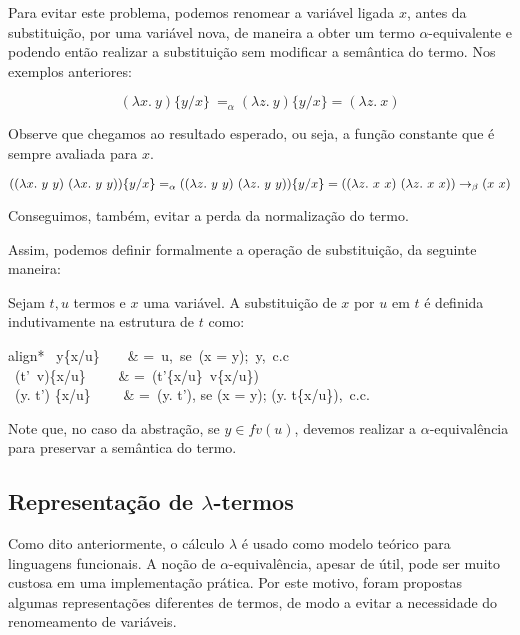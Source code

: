 Para evitar este problema, podemos renomear a variável ligada $x$, antes da
substituição, por uma variável nova, de maneira a obter um termo
$\alpha$-equivalente e podendo então realizar a substituição sem modificar a
semântica do termo. Nos exemplos anteriores:

\[ (\lambda x.\ y)\{y/x\}\ =_{\alpha} (\lambda z.\ y)\{y/x\} = (\lambda z.\ x) \]

Observe que chegamos ao resultado esperado, ou seja, a função constante que é
sempre avaliada para $x$.

\[ ((\lambda x.\ y\ y)\ (\lambda x.\ y\ y))\{y/x\} =_{\alpha} ((\lambda z.\ y\
    y)\ (\lambda z.\ y\ y))\{y/x\} \\
    = ((\lambda z.\ x\ x)\ (\lambda z.\ x\ x)) \rightarrow_{\beta} (x\ x)\]

Conseguimos, também, evitar a perda da normalização do termo.

Assim, podemos definir formalmente a operação de substituição, da seguinte
maneira:

\begin{definicao}\label{classic_subst}
    Sejam $t, u$ termos e $x$ uma variável. A substituição de $x$ por $u$ em
    $t$ é definida indutivamente na estrutura de $t$ como:
\smallskip
\begin{empheq}{align*}
    \ y\{x/u\}\ \ \ \  & =\ u,\ se\ (x = y);\ y,\ c.c \\
    \ (t'\ v)\{x/u\} \ \ \ \  & =\ (t'\{x/u\}\ v\{x/u\}) \\
    \ (\lambda y. t') \{x/u\}  \ \ \ \  & =\ (\lambda y. t'), se (x = y);  
        (\lambda y. t\{x/u\}),\ c.c. \\
\end{empheq}
\end{definicao}

Note que, no caso da abstração, se $y \in fv(u)$, devemos realizar a
$\alpha$-equivalência para preservar a semântica do termo.


\subsection{Representação de $\lambda$-termos}
\label{sub:int_lnr}

Como dito anteriormente, o cálculo $\lambda$ é usado como modelo teórico para
linguagens funcionais. A noção de $\alpha$-equivalência, apesar de útil, pode ser
muito custosa em uma implementação prática. Por este motivo, foram propostas
algumas representações diferentes de termos, de modo a evitar a necessidade do
renomeamento de variáveis. 

